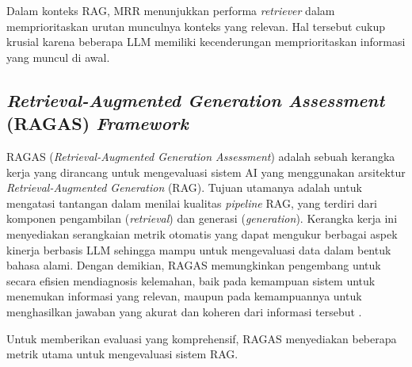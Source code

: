 Dalam konteks RAG, MRR menunjukkan performa \textit{retriever} dalam memprioritaskan urutan munculnya konteks yang relevan.
Hal tersebut cukup krusial karena beberapa LLM memiliki kecenderungan memprioritaskan informasi yang muncul di awal.

\subsection{\textit{Retrieval-Augmented Generation Assessment} (RAGAS) \textit{Framework}}

RAGAS (\textit{Retrieval-Augmented Generation Assessment}) adalah sebuah kerangka kerja yang dirancang untuk mengevaluasi sistem AI yang menggunakan arsitektur \textit{Retrieval-Augmented Generation} (RAG).
Tujuan utamanya adalah untuk mengatasi tantangan dalam menilai kualitas \textit{pipeline} RAG, yang terdiri dari komponen pengambilan (\textit{retrieval}) dan generasi (\textit{generation}).
Kerangka kerja ini menyediakan serangkaian metrik otomatis yang dapat mengukur berbagai aspek kinerja berbasis LLM sehingga mampu untuk mengevaluasi data dalam bentuk bahasa alami.
Dengan demikian, RAGAS memungkinkan pengembang untuk secara efisien mendiagnosis kelemahan, baik pada kemampuan sistem untuk menemukan informasi yang relevan, maupun pada kemampuannya untuk menghasilkan jawaban yang akurat dan koheren dari informasi tersebut \cite{es2024ragas}.

Untuk memberikan evaluasi yang komprehensif, RAGAS menyediakan beberapa metrik utama untuk mengevaluasi sistem RAG.

